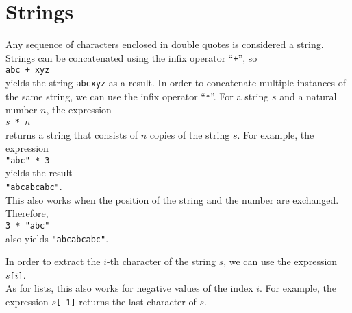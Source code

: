 \section{Strings}
Any sequence of characters enclosed in double quotes is considered a string.
Strings can be concatenated using the infix operator ``\texttt{+}'', so
\\[0.2cm]
\hspace*{1.3cm}
\texttt{abc + xyz}
\\[0.2cm]
yields the string \texttt{abcxyz} as a result.
In order to concatenate multiple instances of the same string, we can use the infix
operator ``\texttt{*}''.  For a string $s$ and a natural number $n$, the expression
\\[0.2cm]
\hspace*{1.3cm}
\texttt{$s$ * $n$}
\\[0.2cm]
returns a string that consists of $n$ copies of the string $s$.  For example, the
expression 
\\[0.2cm]
\hspace*{1.3cm}
\texttt{"abc" * 3}
\\[0.2cm]
yields the result
\\[0.2cm]
\hspace*{1.3cm}
\texttt{"abcabcabc"}.
\\[0.2cm]
This also works when the position of the string and the number are exchanged.  Therefore,
\\[0.2cm]
\hspace*{1.3cm}
\texttt{3 * "abc"}
\\[0.2cm]
also yields \texttt{"abcabcabc"}.


In order to extract the $i$-th character of the string $s$, we can use the expression
\\[0.2cm]
\hspace*{1.3cm}
\texttt{$s$[$i$]}.
\\[0.2cm]
As for lists, this also works for negative values of the index $i$.  For example, the expression \texttt{$s$[-1]}
returns the last character of $s$.

